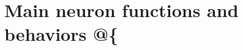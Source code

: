 \hypertarget{group___neuron_functions}{}\section{Main neuron functions and behaviors @\{}
\label{group___neuron_functions}
